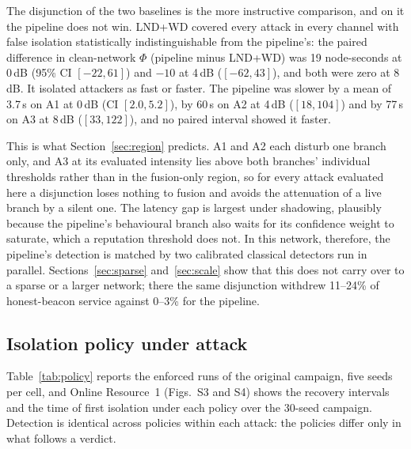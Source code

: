 The disjunction of the two baselines is the more instructive comparison, and
on it the pipeline does not win. LND+WD covered every attack in every channel
with false isolation statistically indistinguishable from the pipeline's: the
paired difference in clean-network $\Phi$ (pipeline minus LND+WD) was 19
node-seconds at 0\,dB (95\% CI $[-22, 61]$) and $-10$ at 4\,dB ($[-62, 43]$),
and both were zero at 8\,dB. It isolated attackers as fast or faster. The
pipeline was slower by a mean of 3.7\,s on A1 at 0\,dB (CI $[2.0, 5.2]$), by
60\,s on A2 at 4\,dB ($[18, 104]$) and by 77\,s on A3 at 8\,dB ($[33, 122]$),
and no paired interval showed it faster.

This is what Section~\ref{sec:region} predicts. A1 and A2 each disturb one
branch only, and A3 at its evaluated intensity lies above both branches'
individual thresholds rather than in the fusion-only region, so for every
attack evaluated here a disjunction loses nothing to fusion and
avoids the attenuation of a live branch by a silent one. The latency gap is
largest under shadowing, plausibly because the pipeline's behavioural branch
also waits for its confidence weight to saturate, which a reputation
threshold does not. In this network, therefore, the pipeline's detection is
matched by two calibrated classical detectors run in parallel.
Sections~\ref{sec:sparse} and~\ref{sec:scale} show that this does not carry
over to a sparse or a larger network; there the same disjunction withdrew
11--24\% of honest-beacon service against 0--3\% for the pipeline.

\subsection{Isolation policy under attack}
\label{sec:policy}

Table~\ref{tab:policy} reports the enforced runs of
the original campaign, five seeds per cell, and Online Resource~1 (Figs.~S3 and S4)
shows the recovery intervals and the time
of first isolation under each policy over the 30-seed campaign. Detection is
identical across policies within each attack: the policies differ only in what
follows a verdict.

